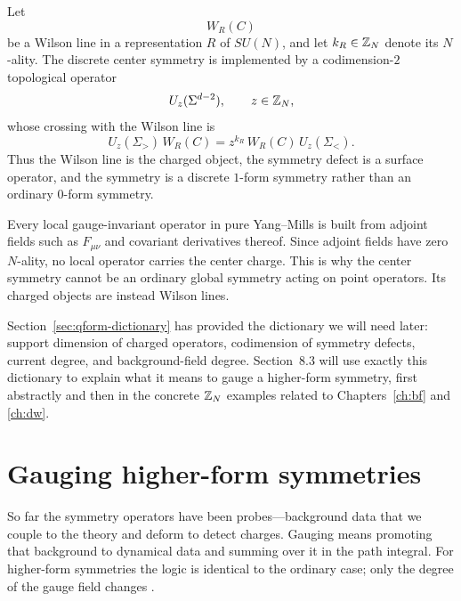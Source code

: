 \begin{example}\label{ex:center-symmetry}
Let
\begin{equation*}
W_R(C)
\end{equation*}
be a Wilson line in a representation $R$ of $SU(N)$, and let $k_R\in \mathbb{Z}_N$ denote its $N$-ality. The discrete center symmetry is implemented by a codimension-$2$ topological operator
\begin{equation*}
U_z(\Sigma^{d-2}),
\qquad
z\in \mathbb{Z}_N,
\end{equation*}
whose crossing with the Wilson line is
\begin{equation}\label{eq:center-crossing}
U_z(\Sigma_{>})\,W_R(C)
=
z^{k_R}\,W_R(C)\,U_z(\Sigma_{<}).
\end{equation}
Thus the Wilson line is the charged object, the symmetry defect is a surface operator, and the symmetry is a discrete $1$-form symmetry rather than an ordinary $0$-form symmetry.
\end{example}

\begin{remark}\label{rem:center-neutral}
Every local gauge-invariant operator in pure Yang--Mills is built from adjoint fields such as $F_{\mu\nu}$ and covariant derivatives thereof. Since adjoint fields have zero $N$-ality, no local operator carries the center charge. This is why the center symmetry cannot be an ordinary global symmetry acting on point operators. Its charged objects are instead Wilson lines.
\end{remark}

\begin{remark}\label{rem:qform-gauging-forward}
Section~\ref{sec:qform-dictionary} has provided the dictionary we will need later: support dimension of charged operators, codimension of symmetry defects, current degree, and background-field degree. Section~8.3 will use exactly this dictionary to explain what it means to gauge a higher-form symmetry, first abstractly and then in the concrete $\mathbb{Z}_N$ examples related to Chapters~\ref{ch:bf} and \ref{ch:dw}.
\end{remark}

\section{Gauging higher-form symmetries}\label{sec:qform-gauging}

So far the symmetry operators have been probes---background data that we couple to the theory and deform to detect charges.  Gauging means promoting that background to dynamical data and summing over it in the path integral.  For higher-form symmetries the logic is identical to the ordinary case; only the degree of the gauge field changes \cite{GKSW2015,Bhardwaj2023Lectures}.


